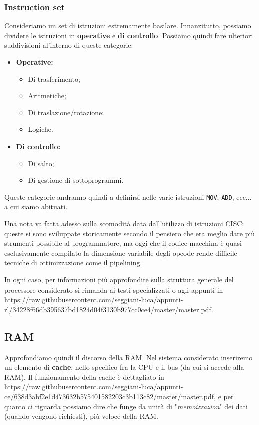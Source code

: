 \documentclass[a4paper,11pt]{article}
\begin{document}
\subsubsection{Instruction set}
Consideriamo un set di istruzioni estremamente basilare.
Innanzitutto, possiamo dividere le istruzioni in \textbf{operative} e \textbf{di controllo}.
Possiamo quindi fare ulteriori suddivisioni al'interno di queste categorie:
\begin{itemize}
	\item \textbf{Operative:}
		\begin{itemize}
			\item Di trasferimento;
			\item Aritmetiche;
			\item Di traslazione/rotazione:
			\item Logiche.
		\end{itemize}
	\item \textbf{Di controllo:}
		\begin{itemize}
			\item Di salto;
			\item Di gestione di sottoprogrammi.
		\end{itemize}
\end{itemize}

Queste categorie andranno quindi a definirsi nelle varie istruzioni \lstinline|MOV|, \lstinline|ADD|, ecc... a cui siamo abituati.

Una nota va fatta adesso sulla scomodità data dall'utilizzo di istruzioni CISC: queste si sono sviluppate storicamente secondo il pensiero che era meglio dare più strumenti possibile al programmatore, ma oggi che il codice macchina è quasi esclusivamente compilato la dimensione variabile degli opcode rende difficile tecniche di ottimizzazione come il pipelining. 

\par\medskip

In ogni caso, per informazioni più approfondite sulla struttura generale del processore considerato si rimanda ai testi specializzati o agli appunti in \url{https://raw.githubusercontent.com/seggiani-luca/appunti-rl/34228f66db395637bd1824d04f3130b977cc0ce4/master/master.pdf}.

\subsection{RAM}
Approfondiamo quindi il discorso della RAM.
Nel sistema considerato inseriremo un elemento di \textbf{cache}, nello specifico fra la CPU e il bus (da cui si accede alla RAM).
Il funzionamento della cache è dettagliato in \url{https://raw.githubusercontent.com/seggiani-luca/appunti-ce/638d3abf2e1d473632b575401582203c3b113c82/master/master.pdf}, e per quanto ci riguarda possiamo dire che funge da unità di "\textit{memoizzazion}" dei dati (quando vengono richiesti), più veloce della RAM.
\end{document}
